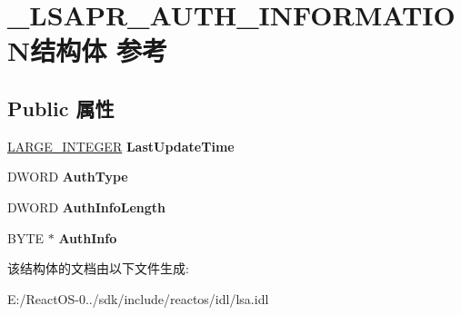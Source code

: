\hypertarget{struct___l_s_a_p_r___a_u_t_h___i_n_f_o_r_m_a_t_i_o_n}{}\section{\+\_\+\+L\+S\+A\+P\+R\+\_\+\+A\+U\+T\+H\+\_\+\+I\+N\+F\+O\+R\+M\+A\+T\+I\+O\+N结构体 参考}
\label{struct___l_s_a_p_r___a_u_t_h___i_n_f_o_r_m_a_t_i_o_n}
\subsection*{Public 属性}
\begin{DoxyCompactItemize}
\item 
\mbox{\label{struct___l_s_a_p_r___a_u_t_h___i_n_f_o_r_m_a_t_i_o_n_a85a5f6094aa869a780d986d64ee3162f}} 
\hyperlink{union___l_a_r_g_e___i_n_t_e_g_e_r}{L\+A\+R\+G\+E\+\_\+\+I\+N\+T\+E\+G\+ER} {\bfseries Last\+Update\+Time}
\item 
\mbox{\label{struct___l_s_a_p_r___a_u_t_h___i_n_f_o_r_m_a_t_i_o_n_a671fba2deb906f37a248048ace79f4ae}} 
D\+W\+O\+RD {\bfseries Auth\+Type}
\item 
\mbox{\label{struct___l_s_a_p_r___a_u_t_h___i_n_f_o_r_m_a_t_i_o_n_a9ac47765059833f3706a4aebc003998a}} 
D\+W\+O\+RD {\bfseries Auth\+Info\+Length}
\item 
\mbox{\label{struct___l_s_a_p_r___a_u_t_h___i_n_f_o_r_m_a_t_i_o_n_a0836e455343f511089fb80c5043ce038}} 
B\+Y\+TE $\ast$ {\bfseries Auth\+Info}
\end{DoxyCompactItemize}


该结构体的文档由以下文件生成\+:\begin{DoxyCompactItemize}
\item 
E\+:/\+React\+O\+S-\/0../sdk/include/reactos/idl/lsa.\+idl\end{DoxyCompactItemize}
